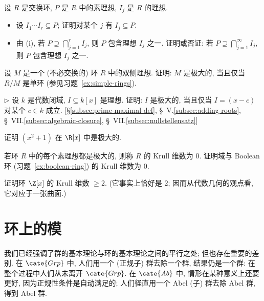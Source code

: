 \begin{prob}
\label{ex:prime-product}
设 $R$ 是交换环, $P$ 是 $R$ 中的素理想, $I_j$ 是 $R$ 的理想.
\begin{itemize}
	\item[(i)] 设 $I_1 \cdots I_r \subseteq P$; 证明对某个 $j$ 有 $I_j \subseteq P$.
	\item[(ii)] 由 (i), 若 $P \supseteq \bigcap_{j=1}^{r} I_j$, 则 $P$ 包含理想 $I_j$ 之一. 证明或否证: 若 $P \supseteq \bigcap_{j=1}^{\infty} I_j$, 则 $P$ 包含理想 $I_j$ 之一.
\end{itemize}
\end{prob}

\begin{prob}
\label{ex:maximal-simple}
设 $M$ 是一个 (不必交换的) 环 $R$ 中的双侧理想. 证明: $M$ 是极大的, 当且仅当 $R/M$ 是单环 (参见习题~\ref{ex:simple-rings}).
\end{prob}

\begin{prob}
\label{ex:closed-maximal}
$\triangleright$ 设 $k$ 是代数闭域, $I \subseteq k[x]$ 是理想. 证明: $I$ 是极大的, 当且仅当 $I = (x - c)$ 对某个 $c \in k$ 成立. [\S\ref{subsec:prime-maximal-def}, \S~V.\ref{subsec:adding-roots}, \S~VII.\ref{subsec:algebraic-closure}, \S~VII.\ref{subsec:nullstellensatz}]
\end{prob}

\begin{prob}
\label{ex:x2-plus-1-maximal}
证明 $(x^2 + 1)$ 在 $\R[x]$ 中是极大的.
\end{prob}

\begin{prob}
\label{ex:krull-0}
若环 $R$ 中的每个素理想都是极大的, 则称 $R$ 的 Krull 维数为 $0$. 证明域与 Boolean 环 (习题~\ref{ex:boolean-ring}) 的 Krull 维数为 $0$.
\end{prob}

\begin{prob}
\label{ex:krull-zx}
证明环 $\Z[x]$ 的 Krull 维数 $\geq 2$. (它事实上恰好是 $2$; 因而从代数几何的观点看, 它对应于一张曲面.)
\end{prob}

\section{环上的模}
\label{subsec:modules-def}

我们已经强调了群的基本理论与环的基本理论之间的平行之处; 但也存在重要的差别. 在 $\cate{Grp}$ 中, 人们用一个 (正规子) 群去除一个群, 结果仍是一个群: 在整个过程中人们从未离开 $\cate{Grp}$. 在 $\cate{Ab}$ 中, 情形在某种意义上还要更好, 因为正规性条件是自动满足的; 人们径直用一个 Abel (子) 群去除 Abel 群, 得到 Abel 群.

